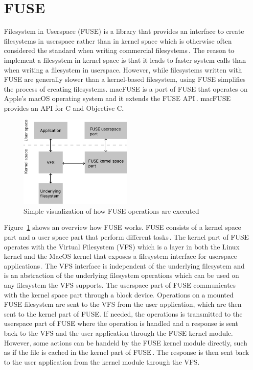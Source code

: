 \section{FUSE}
Filesystem in Userspace (FUSE) is a library that provides an interface to create filesystems in userspace rather than in kernel space which is otherwise often considered the standard when writing commercial filesystems\,\cite{Libfuse2021}. The reason to implement a filesystem in kernel space is that it leads to faster system calls than when writing a filesystem in userspace. However, while filesystems written with FUSE are generally slower than a kernel-based filesystem, using FUSE simplifies the process of creating filesystems. macFUSE is a port of FUSE that operates on Apple's macOS operating system and it extends the FUSE API\,\cite{HomeMacFUSE}. macFUSE provides an API for C and Objective C.

\begin{figure}[!ht]
	\begin{center}
	  \includegraphics[width=0.5\textwidth]{figures/fuse_description.png}
	\end{center}
	\caption{Simple visualization of how FUSE operations are executed}
	\label{fig:fuse_desc}
\end{figure}

Figure~\ref{fig:fuse_desc} shows an overview how FUSE works. FUSE consists of a kernel space part and a user space part that perform different tasks\,\cite{vangoorFUSENotFUSE2017}. The kernel part of FUSE operates with the Virtual Filesystem (VFS) which is a layer in both the Linux kernel and the MacOS kernel that exposes a filesystem interface for userspace applications\,\cite{goochOverviewLinuxVirtual, singhMacOSInternals2006}. The VFS interface is independent of the underlying filesystem and is an abstraction of the underlying filesystem operations which can be used on any filesystem the VFS supports. The userspace part of FUSE communicates with the kernel space part through a block device. Operations on a mounted FUSE filesystem are sent to the VFS from the user application, which are then sent to the kernel part of FUSE. If needed, the operations is transmitted to the userspace part of FUSE where the operation is handled and a response is sent back to the VFS and the user application through the FUSE kernel module. However, some actions can be handeld by the FUSE kernel module directly, such as if the file is cached in the kernel part of FUSE\,\cite{vangoorFUSENotFUSE2017}. The response is then sent back to the user application from the kernel module through the VFS.